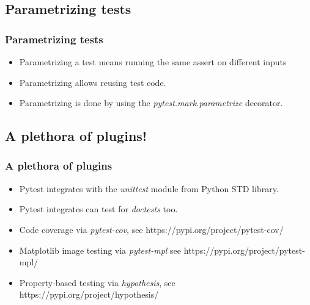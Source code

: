 \documentclass[t]{beamer}
\begin{document}
\subsection{Parametrizing tests}
\begin{frame}[fragile=singleslide]
  \frametitle{Parametrizing tests}

   \begin{itemize}
           \item Parametrizing a test means running the same assert on different inputs
           \item Parametrizing allows reusing test code.
           \item Parametrizing is done by using the \textit{pytest.mark.parametrize} decorator.
   \end{itemize}

\end{frame}

\subsection{A plethora of plugins!}
\begin{frame}[fragile=singleslide]
  \frametitle{A plethora of plugins}

   \begin{itemize}
       \item Pytest integrates with the \textit{unittest} module from Python STD library.
       \item Pytest integrates can test for \textit{doctests} too.
       \item Code coverage via \textit{pytest-cov}, see https://pypi.org/project/pytest-cov/
       \item Matplotlib image testing via \textit{pytest-mpl} see https://pypi.org/project/pytest-mpl/
       \item Property-based testing via \textit{hypothesis}, see https://pypi.org/project/hypothesis/
   \end{itemize}

\end{frame}

\end{document}
